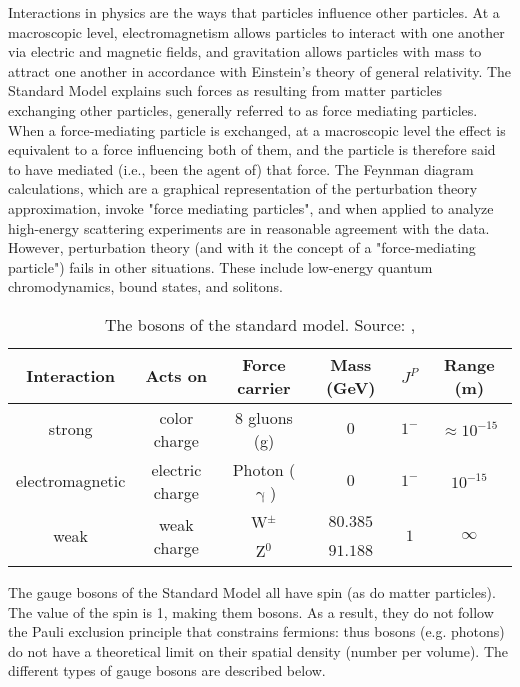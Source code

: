 Interactions in physics are the ways that particles influence other particles. At a macroscopic level, electromagnetism allows particles to interact with one another via electric and magnetic fields, and gravitation allows particles with mass to attract one another in accordance with Einstein's theory of general relativity. The Standard Model explains such forces as resulting from matter particles exchanging other particles, generally referred to as force mediating particles. When a force-mediating particle is exchanged, at a macroscopic level the effect is equivalent to a force influencing both of them, and the particle is therefore said to have mediated (i.e., been the agent of) that force. The Feynman diagram calculations, which are a graphical representation of the perturbation theory approximation, invoke "force mediating particles", and when applied to analyze high-energy scattering experiments are in reasonable agreement with the data. However, perturbation theory (and with it the concept of a "force-mediating particle") fails in other situations. These include low-energy quantum chromodynamics, bound states, and solitons.
\begin{table}[h]
	\caption[Bosons described by the SM]{The bosons of the standard model. Source: \cite{povh}, \cite{faltermann}}
	\label{tab:ch_1_sm_bosons}
	\begin{tabular}{cccccc}
		\toprule
		Interaction & Acts on & Force carrier & Mass (GeV) & {$J^P$} & Range (m)\\
		\midrule
		strong & color charge & 8 gluons (g) & {$0$} & {$1^-$} & $\approx 10^{-15}$\\
		electromagnetic & electric charge & Photon ($\upgamma$) & {$0$} & {$1^-$} & $10^{-15}$\\
		\multirow{2}{*}{weak} & \multirow{2}{*}{weak charge} & W$^{\pm}$ & {$80.385$} & \multirow{2}{*}{$1$} & \multirow{2}{*}{$\infty$}\\
		 & & Z$^0$ & {$91.188$} & &\\
		\bottomrule
	\end{tabular}
\end{table}
The gauge bosons of the Standard Model all have spin (as do matter particles). The value of the spin is 1, making them bosons. As a result, they do not follow the Pauli exclusion principle that constrains fermions: thus bosons (e.g. photons) do not have a theoretical limit on their spatial density (number per volume). The different types of gauge bosons are described below.

